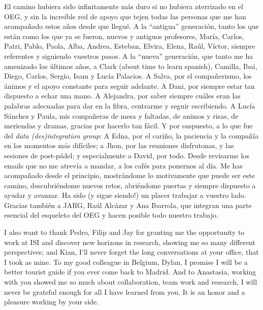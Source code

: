 El camino hubiera sido infinitamente más duro si no hubiera aterrizado en el OEG, y sin la increíble red de apoyo que tejen todas las personas que me han acompañado estos años desde que llegué. 
A la ``antigua'' generación, tanto los que están como los que ya se fueron, nuevos y antiguos profesores, María, Carlos, Patri, Pablo, Paola, Alba, Andrea, Esteban, Elvira, Elena, Raúl, Víctor, siempre referentes y siguiendo vuestros pasos. %
A la ``nueva'' generación, que tanto me ha amenizado los últimos años, a Clark (about time to learn spanish), Camilla, Ibai, Diego, Carlos, Sergio, Isam y Lucía Palacios. 
A Salva, por el compañerismo, los ánimos y el apoyo constante para seguir adelante.
A Dani, por siempre estar tan dispuesto a echar una mano.
A Alejandra, por saber siempre cuáles eran las palabras adecuadas para dar en la fibra, centrarme y seguir escribiendo.
A Lucía Sánchez y Paula, mis compañeras de mesa y faltadas, de animos y risas, de meriendas y dramas, gracias por hacerlo tan fácil. 
Y por suspuesto, a lo que fue del \textit{data (des)integration group}: 
A Edna, por el cariño, la paciencia y la compañía en los momentos más difíciles; 
a Jhon, por las reuniones disfrutonas, y las sesiones de post-pádel;
y especialmente a David, por todo. Desde revisarme los emails que no me atrevía a mandar, a los cafés para ponernos al día. 
Me has acompañado desde el principio, mostrándome lo motivamente que puede ser este camino, descubriéndome nuevos retos, abriéndome puertas y siempre dispuesto a ayudar y avanzar. 
Ha sido (y sigue siendo!) un placer trabajar a vuestro lado.
Gracias también a JARG, Raúl Alcázar y Ana Ibarrola, que integran una parte esencial del esqueleto del OEG y hacen posible todo nuestro trabajo. 

I also want to thank Pedro, Filip and Jay for granting me the opportunity to work at ISI and discover new horizons in research, showing me so many different perspectives; and Kian, I'll never forget the long conversations at your office, that I took as mine. 
To my good colleague in Belgium, Dylan, I promise I will be a better tourist guide if you ever come back to Madrid. 
And to Anastasia, working with you showed me so much about collaboration, team work and research, I will never be grateful enough for all I have learned from you. It is an honor and a pleasure working by your side. 

